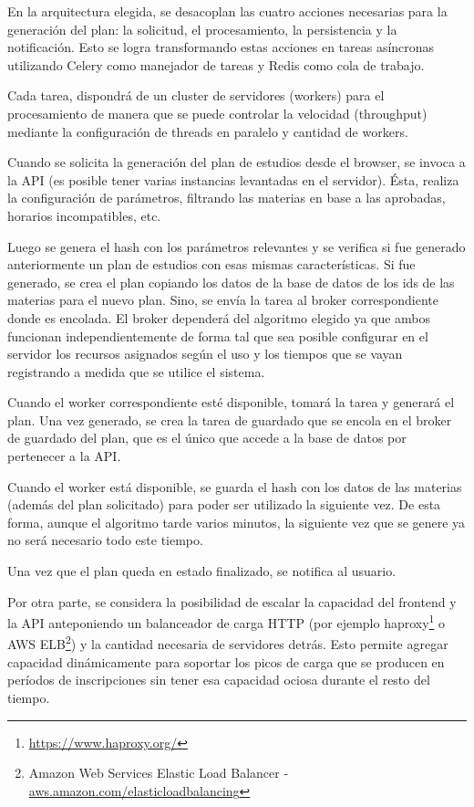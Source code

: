 \documentclass[a4paper]{article}
\begin{document}
En la arquitectura elegida, se desacoplan las cuatro acciones necesarias para la generación del plan: la solicitud, el procesamiento, la persistencia y la notificación. Esto se logra transformando estas acciones en tareas asíncronas utilizando Celery como manejador de tareas y Redis como cola de trabajo.

Cada tarea, dispondrá de un cluster de servidores (workers)  para el procesamiento de manera que se puede controlar la velocidad (throughput) mediante la configuración de threads en paralelo y cantidad de workers.\newline

Cuando se solicita la generación del plan de estudios desde el browser, se invoca a la API (es posible tener varias instancias levantadas en el servidor). Ésta, realiza la configuración de parámetros, filtrando las materias en base a las aprobadas, horarios incompatibles, etc.

Luego se genera el hash con los parámetros relevantes y se verifica si fue generado anteriormente un plan de estudios con esas mismas características. Si fue generado, se crea el plan copiando los datos de la base de datos de los ids de las materias para el nuevo plan. Sino, se envía la tarea al broker correspondiente donde es encolada. El broker dependerá del algoritmo elegido ya que ambos funcionan independientemente de forma tal que sea posible configurar en el servidor los recursos asignados según el uso y los tiempos que se vayan registrando a medida que se utilice el sistema.

Cuando el worker correspondiente esté disponible, tomará la tarea y generará el plan. Una vez generado, se crea la tarea de guardado que se encola en el broker de guardado del plan, que es el único que accede a la base de datos por pertenecer a la API.

Cuando el worker está disponible, se guarda el hash con los datos de las materias (además del plan solicitado) para poder ser utilizado la siguiente vez. De esta forma, aunque el algoritmo tarde varios minutos, la siguiente vez que se genere ya no será necesario todo este tiempo.

Una vez que el plan queda en estado finalizado, se notifica al usuario.\newline

Por otra parte, se considera la posibilidad de escalar la capacidad del frontend y la API anteponiendo un balanceador de carga HTTP (por ejemplo haproxy\footnote{\url{https://www.haproxy.org/}} o AWS ELB\footnote{Amazon Web Services Elastic Load Balancer - \url{aws.amazon.com/elasticloadbalancing}}) y la cantidad necesaria de servidores detrás. Esto permite agregar capacidad dinámicamente para soportar los picos de carga que se producen en períodos de inscripciones sin tener esa capacidad ociosa durante el resto del tiempo. 
\end{document}
